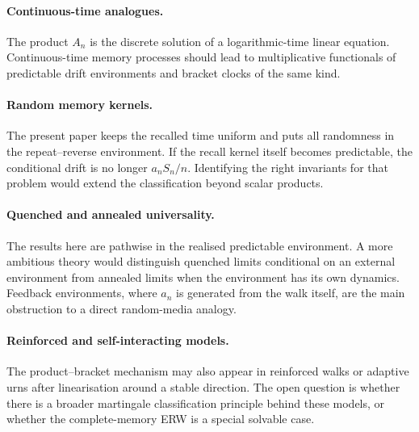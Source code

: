 \documentclass[11pt]{article}
\theoremstyle{definition}
\theoremstyle{remark}
\newcommand{\1}{\mathbf{1}}
\begin{document}
\paragraph{Continuous-time analogues.}
The product \(A_n\) is the discrete solution of a logarithmic-time linear
equation. Continuous-time memory processes should lead to multiplicative
functionals of predictable drift environments and bracket clocks of the same
kind.

\paragraph{Random memory kernels.}
The present paper keeps the recalled time uniform and puts all randomness in the
repeat--reverse environment. If the recall kernel itself becomes predictable,
the conditional drift is no longer \(a_nS_n/n\). Identifying the right invariants
for that problem would extend the classification beyond scalar products.

\paragraph{Quenched and annealed universality.}
The results here are pathwise in the realised predictable environment. A more
ambitious theory would distinguish quenched limits conditional on an external
environment from annealed limits when the environment has its own dynamics.
Feedback environments, where \(a_n\) is generated from the walk itself, are the
main obstruction to a direct random-media analogy.

\paragraph{Reinforced and self-interacting models.}
The product--bracket mechanism may also appear in reinforced walks or adaptive
urns after linearisation around a stable direction. The open question is whether
there is a broader martingale classification principle behind these models, or
whether the complete-memory ERW is a special solvable case.



\end{document}
